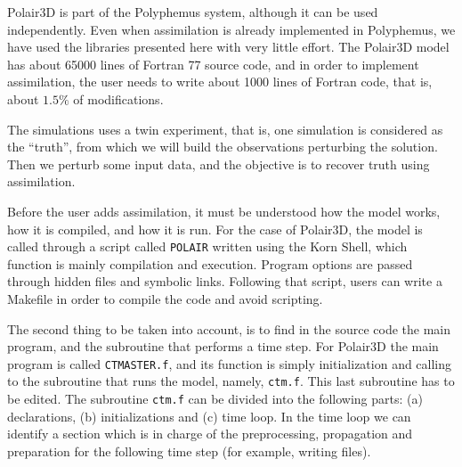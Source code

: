 \documentclass[12pt]{article}
\begin{document}
Polair3D is part of the Polyphemus system, although it can be used independently. Even when assimilation is already implemented in Polyphemus, we have used the libraries presented here with very little effort. The Polair3D model has about 65000 lines of Fortran 77 source code, and in order to implement assimilation, the user needs to write about 1000 lines of Fortran code, that is, about $1{.}5\%$ of modifications. 

The simulations uses a twin experiment, that is, one simulation is considered as the ``truth'', from which we will build the observations perturbing the solution. Then we perturb some input data, and the objective is to recover truth using assimilation.

Before the user adds assimilation, it must be understood how the model works, how it is compiled, and how it is run. For the case of Polair3D, the model is called through a script called {\tt POLAIR} written using the Korn Shell, which function is mainly compilation and execution. Program options are passed through hidden files and symbolic links. Following that script, users can write a Makefile in order to compile the code and avoid scripting. 

The second thing to be taken into account, is to find in the source code the main program, and the subroutine that performs a time step. For Polair3D the main program is called {\tt CTMASTER.f}, and its function is simply initialization and calling to the subroutine that runs the model, namely, {\tt ctm.f}. This last subroutine has to be edited. The subroutine {\tt ctm.f} can be divided into the following parts: (a) declarations, (b) initializations and (c) time loop. In the time loop we can identify a section which is in charge of the preprocessing, propagation and preparation for the following time step (for example, writing files).
\end{document}
